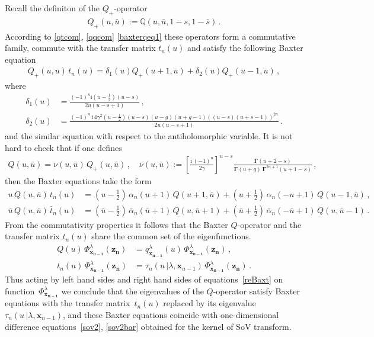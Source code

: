 \documentclass[a4paper,11pt]{article}
\renewcommand{\imath}{\mathrm{i}}
\numberwithin{equation}{section}
\begin{document}
Recall the definiton of the $Q_+$-operator
\begin{align*}
	Q_+(u,\bar{u}):=\mathbb{Q}(u,\bar{u},1-s,1-\bar{s}) \,.
\end{align*}
According to \eqref{qtcom}, \eqref{qqcom} \eqref{baxterqeq1} these operators form a commutative family, commute with the transfer matrix $t_n(u)$ and satisfy the following Baxter equation
\begin{align*}
	Q_+(u,\bar{u})\,t_n(u)=\delta_1(u)Q_+(u+1,\bar{u})+\delta_2(u)Q_+(u-1,\bar{u}) \,,
\end{align*}
where 
\begin{align*}
	\delta_1(u)&=\frac{(-1)^n\imath(u-\frac{1}{2})(u-s)}{2u(u-s+1)} \,, \\
	\delta_2(u)&=\frac{(-1)^n\,\imath\,4\gamma^2(u-\frac{1}{2})(u-s)(u-g)(u+g-1)((u-s)(u+s-1))^{2n}}{2u(u-s+1)} \,.
\end{align*}
and the similar equation with respect to the antiholomorphic variable.
It is not hard to check that if one defines
\begin{align} \label{Qren}
Q(u,\bar{u}) = \nu(u,\bar{u}) \, Q_+(u,\bar{u}) \,, \quad
\nu(u,\bar{u}) := \left[ \frac{\imath\,(-1)^n}{2\gamma} \right]^{u-s} \frac{\mathbf{\Gamma}(u + 2 - s)}{\mathbf{\Gamma}(u + g)
	\,\mathbf{\Gamma}^{2n+1}(u + 1 - s)} \,,
\end{align}
then the Baxter equations take the form
\begin{equation}\label{reBaxt}
	\begin{aligned}
		u\,Q(u,\bar{u})\,t_n(u) 
        &= \left(u-\tfrac{1}{2}\right)\,\alpha_n(u+1)\,Q(u+1,\bar{u})+\left(u+\tfrac{1}{2}\right)\,\alpha_n(-u+1)\,Q(u-1,\bar{u}) \,, \\
		\bar{u}\,Q(u,\bar{u})\,\bar{t}_n(u)
        &= \left(\bar{u}-\tfrac{1}{2}\right)\,\bar{\alpha}_n(\bar{u}+1)\,Q(u,\bar{u}+1)+\left(\bar{u}+\tfrac{1}{2}\right)\,\bar{\alpha}_n(-\bar{u}+1)\,Q(u,\bar{u}-1) \,.	
	\end{aligned}
\end{equation}
From the commutativity properties it follows that the Baxter $Q$-operator and the transfer matrix $t_n(u)$ share the common set of the eigenfunctions.
\begin{align*}
	Q(u)\,\Phi^{\lambda}_{\bm{x_{n-1}}}(\bm{z_n})&=q^{\lambda}_{\bm{x_{n-1}}}(u)\,\Phi^{\lambda}_{\bm{x_{n-1}}}(\bm{z_n}) \,,\\
	t_n(u)\,\Phi^{\lambda}_{\bm{x_{n-1}}}(\bm{z_n})&=\tau_n(u\,|\lambda,\bm{x}_{n-1})\,\Phi^{\lambda}_{\bm{x_{n-1}}}(\bm{z_n})\,.
\end{align*}
Thus acting by left hand sides and right hand sides of equations~\eqref{reBaxt} on function~$\Phi^{\lambda}_{\bm{x_{n-1}}}$ we conclude that the eigenvalues of the $Q$-operator satisfy Baxter equations with the transfer matrix~$t_n(u)$ replaced by its eigenvalue $\tau_n(u\,|\lambda,\bm{x}_{n-1})$, and these Baxter equations
coincide with one-dimensional difference equations~\eqref{sov2}, \eqref{sov2bar} obtained for the kernel of SoV transform.
\end{document}
